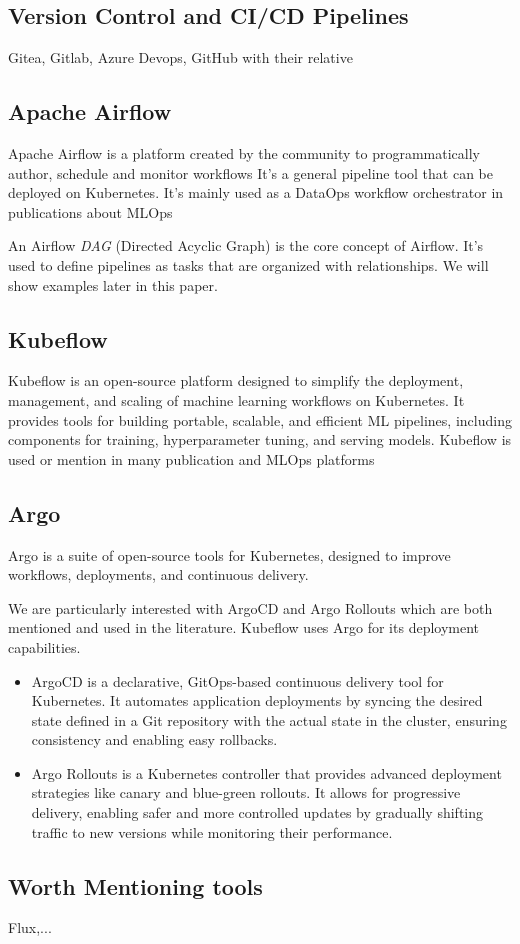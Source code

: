 \subsection{Version Control and CI/CD Pipelines}\label{subsec:version-control-and-ci/cd-pipelines}
Gitea, Gitlab, Azure Devops, GitHub with their relative

\subsection{Apache Airflow}\label{subsec:apache-airflow}
Apache Airflow\cite{airflow} is a platform created by the community to programmatically author, schedule and monitor workflows\cite{airflow}
It's a general pipeline tool that can be deployed on Kubernetes.
It's mainly used as a DataOps workflow orchestrator in publications about MLOps\cite{???,10245408}

An Airflow \textit{DAG} (Directed Acyclic Graph) is the core concept of Airflow\cite{airflow}.
It's used to define pipelines as tasks that are organized with relationships.
We will show examples later in this paper.

\subsection{Kubeflow}\label{subsec:kubeflow2}
Kubeflow\cite{Kubeflow} is an open-source platform designed to simplify the deployment, management, and scaling of machine learning workflows on Kubernetes.
It provides tools for building portable, scalable, and efficient ML pipelines, including components for training, hyperparameter tuning, and serving models.
Kubeflow is used or mention in many publication and MLOps platforms\cite{inproceedings,10855428}

\subsection{Argo}\label{subsec:argo}
Argo\cite{argo} is a suite of open-source tools for Kubernetes, designed to improve workflows, deployments, and continuous delivery.

We are particularly interested with ArgoCD and Argo Rollouts which are both mentioned and used in the literature.
Kubeflow uses Argo for its deployment capabilities.

\begin{itemize}
    \item ArgoCD
     is a declarative, GitOps-based continuous delivery tool for Kubernetes.
     It automates application deployments by syncing the desired state
    defined in a Git repository with the actual state in the cluster,
    ensuring consistency and enabling easy rollbacks.

    \item Argo Rollouts
     is a Kubernetes controller that provides advanced deployment strategies
     like canary and blue-green rollouts. It allows for progressive
    delivery, enabling safer and more controlled updates by gradually
    shifting traffic to new versions while monitoring their performance.
\end{itemize}


\subsection{Worth Mentioning tools}
Flux,...